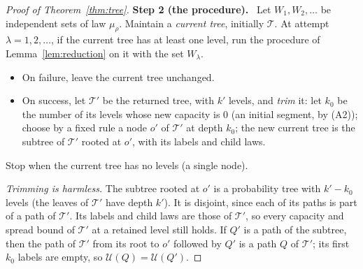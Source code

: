 \documentclass[11pt]{article}
\numberwithin{equation}{section}
\newcommand{\TT}{\mathcal T}
\newcommand{\UU}{\mathcal U}
\newcommand{\step}[2]{\par\medskip\noindent\textbf{Step #1 (#2).}\ }
\begin{document}
\begin{proof}[Proof of Theorem~\ref{thm:tree}]
\step{2}{the procedure}
Let $W_1,W_2,\ldots$ be independent sets of law $\mu_\rho$. Maintain a
\emph{current tree}, initially $\TT$. At attempt $\lambda=1,2,\ldots$,
if the current tree has at least one level, run the procedure of
Lemma~\ref{lem:reduction} on it with the set $W_\lambda$.
\begin{itemize}[leftmargin=1.6em,itemsep=2pt]
 \item On failure, leave the current tree unchanged.
 \item On success, let $\TT'$ be the returned tree, with $k'$ levels,
 and \emph{trim} it: let $k_0$ be the number of its levels whose new
 capacity is $0$ (an initial segment, by (A2)); choose by a fixed rule
 a node $o'$ of $\TT'$ at depth $k_0$; the new current tree is the
 subtree of $\TT'$ rooted at $o'$, with its labels and child laws.
\end{itemize}
Stop when the current tree has no levels (a single node).

\emph{Trimming is harmless.} The subtree rooted at $o'$ is a probability
tree with $k'-k_0$ levels (the leaves of $\TT'$ have depth $k'$). It is
disjoint, since each of its paths is part of a path of $\TT'$. Its
labels and child laws are those of $\TT'$, so every capacity and spread
bound of $\TT'$ at a retained level still holds. If $Q'$ is a path of
the subtree, then the path of $\TT'$ from its root to $o'$ followed by
$Q'$ is a path $Q$ of $\TT'$; its first $k_0$ labels are empty, so
$\UU(Q)=\UU(Q')$.


\end{proof}
\end{document}
